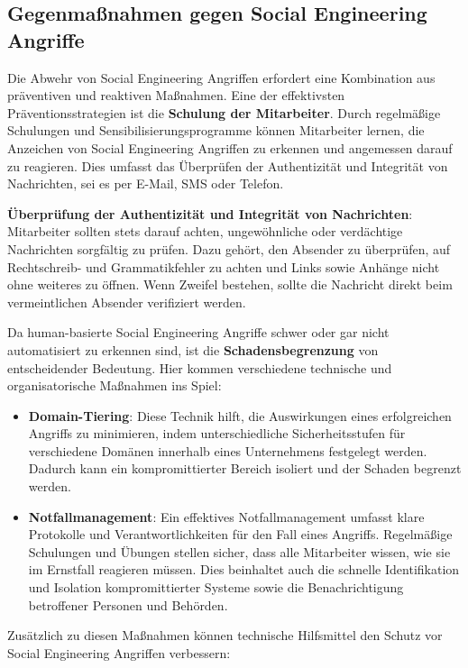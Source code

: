 \subsection{Gegenmaßnahmen gegen Social Engineering Angriffe}\label{subsec:gegenmassnahmen-gegen-social-engineering-angriffe}
Die Abwehr von Social Engineering Angriffen erfordert eine Kombination aus präventiven und reaktiven Maßnahmen.
Eine der effektivsten Präventionsstrategien ist die \textbf{Schulung der Mitarbeiter}.
Durch regelmäßige Schulungen und Sensibilisierungsprogramme können Mitarbeiter lernen, die Anzeichen von Social Engineering Angriffen zu erkennen und angemessen darauf zu reagieren.
Dies umfasst das Überprüfen der Authentizität und Integrität von Nachrichten, sei es per E-Mail, SMS oder Telefon.

\textbf{Überprüfung der Authentizität und Integrität von Nachrichten}: Mitarbeiter sollten stets darauf achten, ungewöhnliche oder verdächtige Nachrichten sorgfältig zu prüfen.
Dazu gehört, den Absender zu überprüfen, auf Rechtschreib- und Grammatikfehler zu achten und Links sowie Anhänge nicht ohne weiteres zu öffnen.
Wenn Zweifel bestehen, sollte die Nachricht direkt beim vermeintlichen Absender verifiziert werden.

Da human-basierte Social Engineering Angriffe schwer oder gar nicht automatisiert zu erkennen sind, ist die \textbf{Schadensbegrenzung} von entscheidender Bedeutung.
Hier kommen verschiedene technische und organisatorische Maßnahmen ins Spiel:

\begin{itemize}
    \item \textbf{Domain-Tiering}: Diese Technik hilft, die Auswirkungen eines erfolgreichen Angriffs zu minimieren, indem unterschiedliche Sicherheitsstufen für verschiedene Domänen innerhalb eines Unternehmens festgelegt werden.
     Dadurch kann ein kompromittierter Bereich isoliert und der Schaden begrenzt werden.
    \item \textbf{Notfallmanagement}: Ein effektives Notfallmanagement umfasst klare Protokolle und Verantwortlichkeiten für den Fall eines Angriffs.
     Regelmäßige Schulungen und Übungen stellen sicher, dass alle Mitarbeiter wissen, wie sie im Ernstfall reagieren müssen.
     Dies beinhaltet auch die schnelle Identifikation und Isolation kompromittierter Systeme sowie die Benachrichtigung betroffener Personen und Behörden.
\end{itemize}

Zusätzlich zu diesen Maßnahmen können technische Hilfsmittel den Schutz vor Social Engineering Angriffen verbessern:

